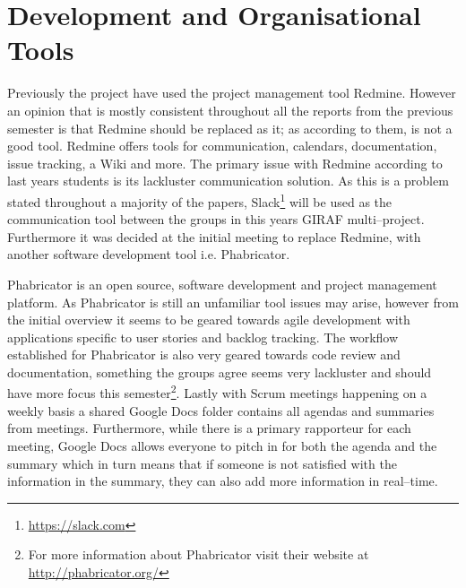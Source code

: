 \section{Development and Organisational Tools}
Previously the project have used the project management tool Redmine.
However an opinion that is mostly consistent throughout all the reports from the previous semester is that Redmine should be replaced as it;
as according to them, is not a good tool.
Redmine offers tools for communication, calendars, documentation, issue tracking, a Wiki and more.
The primary issue with Redmine according to last years students is its lackluster communication solution.
As this is a problem stated throughout a majority of the papers, Slack\footnote{\url{https://slack.com}} will be used as the communication tool between the groups in this years GIRAF multi--project.
Furthermore it was decided at the initial meeting to replace Redmine, with another software development tool i.e. Phabricator.

Phabricator is an open source, software development and project management platform.
As Phabricator is still an unfamiliar tool issues may arise, however from the initial overview it seems to be geared towards agile development with applications specific to user stories and backlog tracking.
The workflow established for Phabricator is also very geared towards code review and documentation, something the groups agree seems very lackluster and should have more focus this semester\footnote{For more information about Phabricator visit their website at \url{http://phabricator.org/}}.
Lastly with Scrum meetings happening on a weekly basis a shared Google Docs folder contains all agendas and summaries from meetings.
Furthermore, while there is a primary rapporteur for each meeting, Google Docs allows everyone to pitch in for both the agenda and the summary which in turn means that if someone is not satisfied with the information in the summary, they can also add more information in real--time.


